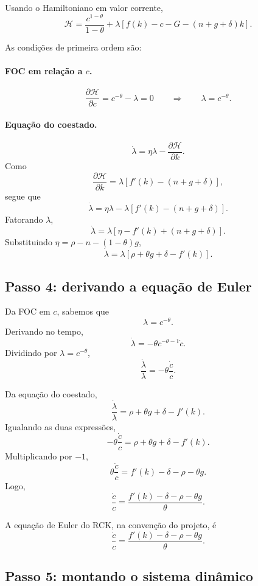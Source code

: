 \documentclass[11pt,a4paper]{article}
\begin{document}
Usando o Hamiltoniano em valor corrente,
\[
\mathcal H
=
\frac{c^{1-\theta}}{1-\theta}
+
\lambda\left[f(k)-c-G-(n+g+\delta)k\right].
\]

As condi\c{c}\~oes de primeira ordem s\~ao:

\paragraph{FOC em rela\c{c}\~ao a \(c\).}
\[
\frac{\partial \mathcal H}{\partial c}
=
c^{-\theta}-\lambda=0
\qquad \Longrightarrow \qquad
\lambda=c^{-\theta}.
\]

\paragraph{Equa\c{c}\~ao do coestado.}
\[
\dot\lambda=\eta\lambda-\frac{\partial \mathcal H}{\partial k}.
\]
Como
\[
\frac{\partial \mathcal H}{\partial k}
=
\lambda\left[f'(k)-(n+g+\delta)\right],
\]
segue que
\[
\dot\lambda
=
\eta\lambda-\lambda\left[f'(k)-(n+g+\delta)\right].
\]
Fatorando \(\lambda\),
\[
\dot\lambda
=
\lambda\left[\eta-f'(k)+(n+g+\delta)\right].
\]
Substituindo \(\eta=\rho-n-(1-\theta)g\),
\[
\dot\lambda
=
\lambda\left[\rho+\theta g+\delta-f'(k)\right].
\]

\subsection{Passo 4: derivando a equa\c{c}\~ao de Euler}

Da FOC em \(c\), sabemos que
\[
\lambda=c^{-\theta}.
\]
Derivando no tempo,
\[
\dot\lambda=-\theta c^{-\theta-1}\dot c.
\]
Dividindo por \(\lambda=c^{-\theta}\),
\[
\frac{\dot\lambda}{\lambda}
=
-\theta\frac{\dot c}{c}.
\]

Da equa\c{c}\~ao do coestado,
\[
\frac{\dot\lambda}{\lambda}
=
\rho+\theta g+\delta-f'(k).
\]
Igualando as duas express\~oes,
\[
-\theta\frac{\dot c}{c}
=
\rho+\theta g+\delta-f'(k).
\]
Multiplicando por \(-1\),
\[
\theta\frac{\dot c}{c}
=
f'(k)-\delta-\rho-\theta g.
\]
Logo,
\[
\frac{\dot c}{c}
=
\frac{f'(k)-\delta-\rho-\theta g}{\theta}.
\]

\begin{resultado}
A equa\c{c}\~ao de Euler do RCK, na conven\c{c}\~ao do projeto, \'e
\[
\frac{\dot c}{c}
=
\frac{f'(k)-\delta-\rho-\theta g}{\theta}.
\]
\end{resultado}

\subsection{Passo 5: montando o sistema din\^amico}
\end{document}
